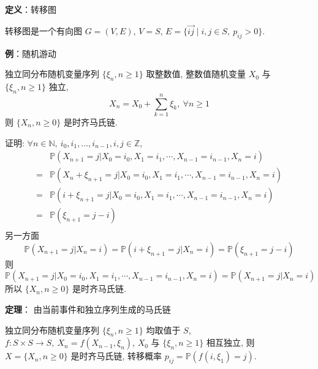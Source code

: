 \documentclass[openany]{ctexbook}
\theoremstyle{kaiti}
\theoremstyle{normal}
\begin{document}
\textbf{定义}：转移图

转移图是一个有向图 $G=(V,E)$, $V=S$, $E=\Big\{\overrightarrow{ij} \mid i,j\in S,~p_{ij}>0\Big\}$.

\textbf{例}：随机游动

独立同分布随机变量序列 $\{\xi_n,n\geqslant1\}$ 取整数值, 整数值随机变量 $X_0$ 与 $\{\xi_n,n\geqslant1\}$ 独立,
\begin{equation}
  X_n=X_0+\sum_{k=1}^n\xi_k,\ \forall n\geqslant1
\end{equation}
则 $\{X_n,n\geqslant0\}$ 是时齐马氏链.

证明: $\forall n\in\mathbb{N},\ i_0,i_1,\ldots,i_{n-1},i,j\in \mathbb{Z}$, 
\begin{equation}
  \begin{aligned}
    & \mathbb{P}(X_{n+1}=j|X_0=i_0,X_1=i_1,\cdots,X_{n-1}=i_{n-1},X_n=i)\\
    =& \mathbb{P}(X_n+\xi_{n+1}=j|X_0=i_0,X_1=i_1,\cdots,X_{n-1}=i_{n-1},X_n=i)\\
    =& \mathbb{P}(i+\xi_{n+1}=j|X_0=i_0,X_1=i_1,\cdots,X_{n-1}=i_{n-1},X_n=i)\\
    =& \mathbb{P}(\xi_{n+1}=j-i)\\
  \end{aligned} 
\end{equation} 另一方面 
\begin{equation}
  \mathbb{P}(X_{n+1}=j|X_n=i)=\mathbb{P}(i+\xi_{n+1}=j|X_n=i)=\mathbb{P}(\xi_{n+1}=j-i) 
\end{equation} 则 
\begin{equation}
  \mathbb{P}(X_{n+1}=j|X_0=i_0,X_1=i_1,\cdots,X_{n-1}=i_{n-1},X_n=i)=\mathbb{P}(X_{n+1}=j|X_n=i) 
\end{equation} 所以 $\{X_n,n\geqslant0\}$ 是时齐马氏链.

\textbf{定理}： 由当前事件和独立序列生成的马氏链

独立同分布随机变量序列 $\{\xi_n,n\geqslant1\}$ 均取值于 $S$, $f:S\times S\to S,\ X_n=f(X_{n-1},\xi_n)$, $X_0$ 与 $\{\xi_n,n\geqslant1\}$ 相互独立, 则 $X=\{X_n,n\geqslant0\}$ 是时齐马氏链, 转移概率 $p_{ij}=\mathbb{P}(f(i,\xi_1)=j)$.
\end{document}
